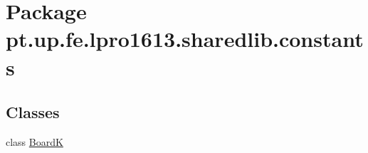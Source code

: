 \hypertarget{namespacept_1_1up_1_1fe_1_1lpro1613_1_1sharedlib_1_1constants}{}\section{Package pt.\+up.\+fe.\+lpro1613.\+sharedlib.\+constants}
\label{namespacept_1_1up_1_1fe_1_1lpro1613_1_1sharedlib_1_1constants}
\subsection*{Classes}
\begin{DoxyCompactItemize}
\item 
class \hyperlink{classpt_1_1up_1_1fe_1_1lpro1613_1_1sharedlib_1_1constants_1_1_board_k}{BoardK}
\end{DoxyCompactItemize}
